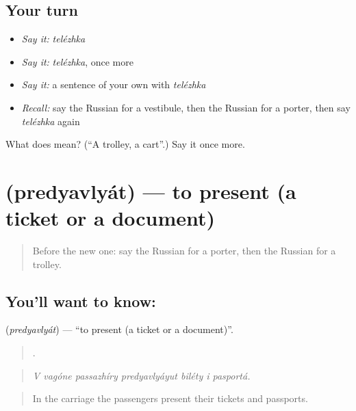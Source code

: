 \subsection*{Your turn}
\begin{itemize}
\raggedright
  \item \emph{Say it:} \emph{telézhka}
  \item \emph{Say it:} \emph{telézhka}, once more
  \item \emph{Say it:} a sentence of your own with \emph{telézhka}
  \item \emph{Recall:} say the Russian for a vestibule, then the Russian for a porter, then say \emph{telézhka} again
\end{itemize}

\begin{tcolorbox}[breakable,colback=teal!4,colframe=teal!35!black,title={Before you move on}]
What does  mean? (\textquotedblleft{}A trolley, a cart\textquotedblright{}.) Say it once more.
\end{tcolorbox}
\section[\texorpdfstring{\ru{предъявлять} (predyavlyát)}{предъявлять (predyavlyát)}]{ (predyavlyát) — to present (a ticket or a document)}

\label{lesson:RU-C416-predyavlyat}



\begin{quote}
Before the new one: say the Russian for a porter, then the Russian for a trolley.
\end{quote}

\subsection*{You'll want to know: }
\textbf{} (\emph{predyavlyát}) — \textquotedblleft{}to present (a ticket or a document)\textquotedblright{}.

\begin{quote}
      .
\end{quote}

\begin{quote}
\emph{V vagóne passazhíry predyavlyáyut biléty i pasportá.}
\end{quote}

\begin{quote}
In the carriage the passengers present their tickets and passports.
\end{quote}

